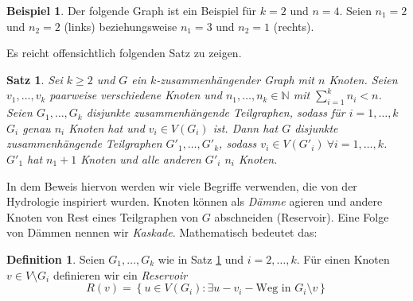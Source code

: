 \documentclass[12pt,a4paper]{scrartcl}
\numberwithin{equation}{section} %
\theoremstyle{definition}
\newtheorem{defn}[auf]{Definition}
\newtheorem{bsp}[auf]{Beispiel}
\theoremstyle{plain}
\newtheorem{sa}[auf]{Satz}
\newcommand{\nn}{\mathbb{N}}
\begin{document}
\begin{bsp}
    Der folgende Graph ist ein Beispiel für $k=2$ und $n=4$. Seien $n_1=2$ und $n_2=2$ (links) beziehungsweise $n_1=3$ und $n_2=1$ (rechts).
    \begin{figure}[h]
        \centering
{}
\end{figure}
\end{bsp}
Es reicht offensichtlich folgenden Satz zu zeigen.
\begin{sa}
Sei $k\ge 2$ und $G$ ein $k$-zusammenhängender Graph mit $n$ Knoten. Seien $v_1,\dotsc,v_k$ paarweise verschiedene Knoten und $n_1,\dotsc,n_k\in\nn$ mit $\sum_{i=1}^kn_i<n$. Seien $G_1,\dotsc,G_k$ disjunkte zusammenhängende Teilgraphen, sodass für $i=1,\dotsc,k$ $G_i$ genau $n_i$ Knoten hat und $v_i\in V(G_i)$ ist. Dann hat $G$ disjunkte zusammenhängende Teilgraphen $G'_1,\dotsc,G'_k$, sodass $v_i\in V(G'_i)~\forall i=1,\dotsc,k$. $G'_1$ hat $n_1+1$ Knoten und alle anderen $G'_i$ $n_i$ Knoten.
\label{sa:2}
\end{sa}
In dem Beweis hiervon werden wir viele Begriffe verwenden, die von der Hydrologie inspiriert wurden. Knoten können als \emph{Dämme} agieren und andere Knoten von Rest eines Teilgraphen von $G$ abschneiden (Reservoir). Eine Folge von Dämmen nennen wir \emph{Kaskade}. Mathematisch bedeutet das:
\begin{defn}
Seien $G_1,\dotsc, G_k$ wie in Satz \ref{sa:2} und $i=2,\dotsc,k$. Für einen Knoten $v\in V\setminus G_i$ definieren wir ein \emph{Reservoir} 
\[R(v)=\left\lbrace u\in V(G_i)\colon \exists u-v_i-\text{Weg in }G_i\setminus v\right\rbrace\] 
\end{defn}
\end{document}
